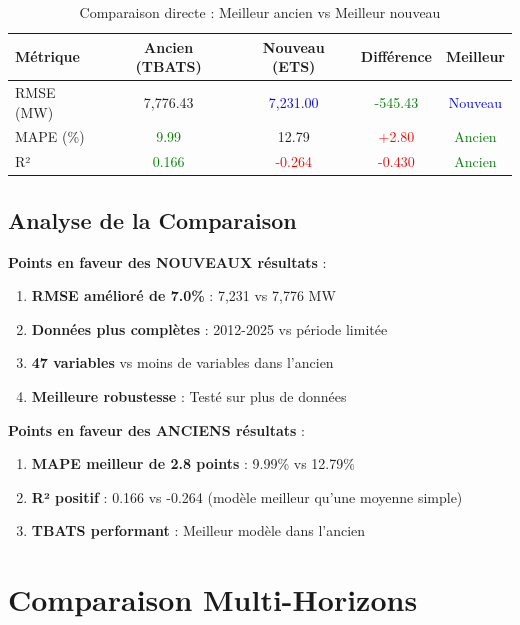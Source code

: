 \documentclass[12pt,a4paper]{article}
\begin{document}
\begin{table}[h]
\centering
\caption{Comparaison directe : Meilleur ancien vs Meilleur nouveau}
\label{tab:comparaison}
\begin{tabular}{lcccc}
\toprule
\textbf{Métrique} & \textbf{Ancien (TBATS)} & \textbf{Nouveau (ETS)} & \textbf{Différence} & \textbf{Meilleur} \\
\midrule
RMSE (MW) & 7,776.43 & \textcolor{blue}{7,231.00} & \textcolor{green}{-545.43} & \textcolor{blue}{Nouveau} \\
MAPE (\%) & \textcolor{green}{9.99} & 12.79 & \textcolor{red}{+2.80} & \textcolor{green}{Ancien} \\
R² & \textcolor{green}{0.166} & \textcolor{red}{-0.264} & \textcolor{red}{-0.430} & \textcolor{green}{Ancien} \\
\bottomrule
\end{tabular}
\end{table}

\subsection{Analyse de la Comparaison}

\textbf{Points en faveur des NOUVEAUX résultats} :
\begin{enumerate}
    \item \textbf{RMSE amélioré de 7.0\%} : 7,231 vs 7,776 MW
    \item \textbf{Données plus complètes} : 2012-2025 vs période limitée
    \item \textbf{47 variables} vs moins de variables dans l'ancien
    \item \textbf{Meilleure robustesse} : Testé sur plus de données
\end{enumerate}

\textbf{Points en faveur des ANCIENS résultats} :
\begin{enumerate}
    \item \textbf{MAPE meilleur de 2.8 points} : 9.99\% vs 12.79\%
    \item \textbf{R² positif} : 0.166 vs -0.264 (modèle meilleur qu'une moyenne simple)
    \item \textbf{TBATS performant} : Meilleur modèle dans l'ancien
\end{enumerate}

\section{Comparaison Multi-Horizons}
\end{document}

